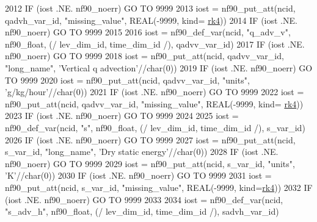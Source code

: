 \begin{DoxyCode}
2012     \textcolor{keywordflow}{IF} (iost .NE. nf90\_noerr) \textcolor{keywordflow}{GO TO} 9999
2013     iost    = nf90\_put\_att(ncid, qadvh\_var\_id, \textcolor{stringliteral}{"missing\_value"}, \textcolor{keywordtype}{REAL}(-9999, kind=
      \hyperlink{namespaceportable_abaed22a509442771d3fba69bebda0b33}{rk4}))
2014     \textcolor{keywordflow}{IF} (iost .NE. nf90\_noerr) \textcolor{keywordflow}{GO TO} 9999
2015 
2016     iost    = nf90\_def\_var(ncid, \textcolor{stringliteral}{"q\_adv\_v"}, nf90\_float, (/ lev\_dim\_id, time\_dim\_id /), qadvv\_var\_id)
2017     \textcolor{keywordflow}{IF} (iost .NE. nf90\_noerr) \textcolor{keywordflow}{GO TO} 9999
2018     iost    = nf90\_put\_att(ncid, qadvv\_var\_id, \textcolor{stringliteral}{"long\_name"}, \textcolor{stringliteral}{'Vertical q advection'}//char(0))
2019     \textcolor{keywordflow}{IF} (iost .NE. nf90\_noerr) \textcolor{keywordflow}{GO TO} 9999
2020     iost    = nf90\_put\_att(ncid, qadvv\_var\_id, \textcolor{stringliteral}{"units"}, \textcolor{stringliteral}{'g/kg/hour'}//char(0))
2021     \textcolor{keywordflow}{IF} (iost .NE. nf90\_noerr) \textcolor{keywordflow}{GO TO} 9999
2022     iost    = nf90\_put\_att(ncid, qadvv\_var\_id, \textcolor{stringliteral}{"missing\_value"}, \textcolor{keywordtype}{REAL}(-9999, kind=
      \hyperlink{namespaceportable_abaed22a509442771d3fba69bebda0b33}{rk4}))
2023     \textcolor{keywordflow}{IF} (iost .NE. nf90\_noerr) \textcolor{keywordflow}{GO TO} 9999
2024 
2025     iost    = nf90\_def\_var(ncid, \textcolor{stringliteral}{"s"}, nf90\_float, (/ lev\_dim\_id, time\_dim\_id /), s\_var\_id)
2026     \textcolor{keywordflow}{IF} (iost .NE. nf90\_noerr) \textcolor{keywordflow}{GO TO} 9999
2027     iost    = nf90\_put\_att(ncid, s\_var\_id, \textcolor{stringliteral}{"long\_name"}, \textcolor{stringliteral}{'Dry static energy'}//char(0))
2028     \textcolor{keywordflow}{IF} (iost .NE. nf90\_noerr) \textcolor{keywordflow}{GO TO} 9999
2029     iost    = nf90\_put\_att(ncid, s\_var\_id, \textcolor{stringliteral}{"units"}, \textcolor{stringliteral}{'K'}//char(0))
2030     \textcolor{keywordflow}{IF} (iost .NE. nf90\_noerr) \textcolor{keywordflow}{GO TO} 9999
2031     iost    = nf90\_put\_att(ncid, s\_var\_id, \textcolor{stringliteral}{"missing\_value"}, \textcolor{keywordtype}{REAL}(-9999, kind=\hyperlink{namespaceportable_abaed22a509442771d3fba69bebda0b33}{rk4}))
2032     \textcolor{keywordflow}{IF} (iost .NE. nf90\_noerr) \textcolor{keywordflow}{GO TO} 9999
2033 
2034     iost    = nf90\_def\_var(ncid, \textcolor{stringliteral}{"s\_adv\_h"}, nf90\_float, (/ lev\_dim\_id, time\_dim\_id /), sadvh\_var\_id)

\end{DoxyCode}
